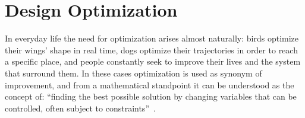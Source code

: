 %



\section{Design Optimization}

In everyday life the need for optimization arises almost naturally: birds optimize their wings' shape in real time, dogs optimize their trajectories in order to reach a specific place, and people constantly seek to improve their lives and the system that surround them. In these cases optimization is used as synonym of improvement, and from a mathematical standpoint it can be understood as the concept of: ``finding the best possible solution by changing variables that can be controlled, often subject to constraints''~\cite{Joaquim:engineering_design_opt}.


